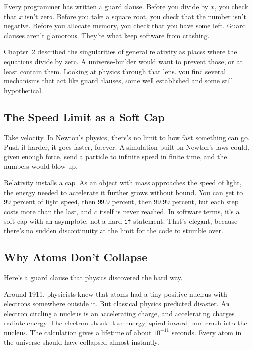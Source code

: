 Every programmer has written a guard clause. Before you divide by \(x\), you check that \(x\) isn't zero. Before you take a square root, you check that the number isn't negative. Before you allocate memory, you check that you have some left. Guard clauses aren't glamorous. They're what keep software from crashing.

Chapter~2 described the singularities of general relativity as places where the equations divide by zero. A universe-builder would want to prevent those, or at least contain them. Looking at physics through that lens, you find several mechanisms that act like guard clauses, some well established and some still hypothetical.

\subsection{The Speed Limit as a Soft Cap}

Take velocity. In Newton's physics, there's no limit to how fast something can go. Push it harder, it goes faster, forever. A simulation built on Newton's laws could, given enough force, send a particle to infinite speed in finite time, and the numbers would blow up.

Relativity installs a cap. As an object with mass approaches the speed of light, the energy needed to accelerate it further grows without bound. You can get to 99 percent of light speed, then 99.9 percent, then 99.99 percent, but each step costs more than the last, and \(c\) itself is never reached. In software terms, it's a soft cap with an asymptote, not a hard \texttt{if} statement. That's elegant, because there's no sudden discontinuity at the limit for the code to stumble over.

\subsection{Why Atoms Don't Collapse}

Here's a guard clause that physics discovered the hard way.

Around 1911, physicists knew that atoms had a tiny positive nucleus with electrons somewhere outside it. But classical physics predicted disaster. An electron circling a nucleus is an accelerating charge, and accelerating charges radiate energy. The electron should lose energy, spiral inward, and crash into the nucleus. The calculation gives a lifetime of about \(10^{-11}\) seconds. Every atom in the universe should have collapsed almost instantly.

